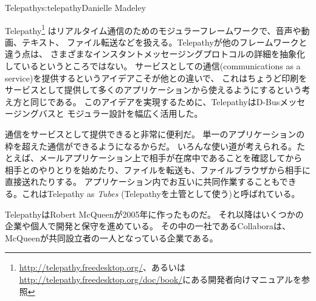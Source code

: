 \begin{aosachapter}{Telepathy}{s:telepathy}{Danielle Madeley}

Telepathy\footnote{\url{http://telepathy.freedesktop.org/}、あるいは
\url{http://telepathy.freedesktop.org/doc/book/}にある開発者向けマニュアルを参照}
はリアルタイム通信のためのモジュラーフレームワークで、音声や動画、テキスト、
ファイル転送などを扱える。Telepathyが他のフレームワークと違う点は、
さまざまなインスタントメッセージングプロトコルの詳細を抽象化しているというところではない。
サービスとしての通信(communications as a service)を提供するというアイデアこそが他との違いで、
これはちょうど印刷をサービスとして提供して多くのアプリケーションから使えるようにするという考え方と同じである。
このアイデアを実現するために、TelepathyはD-Busメッセージングバスと
モジュラー設計を幅広く活用した。

通信をサービスとして提供できると非常に便利だ。
単一のアプリケーションの枠を超えた通信ができるようになるからだ。
いろんな使い道が考えられる。たとえば、メールアプリケーション上で相手が在席中であることを確認してから
相手とのやりとりを始めたり、ファイルを転送も、ファイルブラウザから相手に直接送れたりする。
アプリケーション内でお互いに共同作業することもできる。これはTelepathy as \emph{Tubes}
(Telepathyを土管として使う)と呼ばれている。

TelepathyはRobert McQueenが2005年に作ったものだ。
それ以降はいくつかの企業や個人で開発と保守を進めている。
その中の一社であるCollaboraは、McQueenが共同設立者の一人となっている企業である。


\end{aosachapter}
